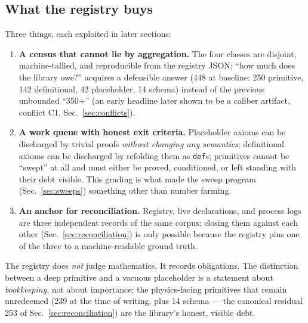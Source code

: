 \subsection{What the registry buys}
\label{sec:registry-value}
Three things, each exploited in later sections:

\begin{enumerate}
\item \textbf{A census that cannot lie by aggregation.} The four
classes are disjoint, machine-tallied, and reproducible from the
registry JSON; ``how much does the library owe?'' acquires a
defensible answer (448 at baseline: 250 primitive, 142
definitional, 42 placeholder, 14 schema) instead of the previous
unbounded ``350+'' (an early headline later shown to be a
caliber artifact, conflict C1, Sec.~\ref{sec:conflicts}).
\item \textbf{A work queue with honest exit criteria.} Placeholder
axioms can be discharged by trivial proofs \emph{without changing
any semantics}; definitional axioms can be discharged by
refolding them as \texttt{def}s; primitives cannot be ``swept'' at
all and must either be proved, conditioned, or left standing with
their debt visible. This grading is what made the sweep program
(Sec.~\ref{sec:sweeps}) something other than number farming.
\item \textbf{An anchor for reconciliation.} Registry, live
declarations, and process logs are three independent records of the
same corpus; closing them against each other
(Sec.~\ref{sec:reconciliation}) is only possible because the
registry pins one of the three to a machine-readable ground truth.
\end{enumerate}

The registry does \emph{not} judge mathematics. It records
obligations. The distinction between a deep primitive and a
vacuous placeholder is a statement about \emph{bookkeeping}, not
about importance; the physics-facing primitives that remain
unredeemed (239 at the time of writing, plus 14 schema --- the
canonical residual 253 of Sec.~\ref{sec:reconciliation}) are the
library's honest, visible debt.
